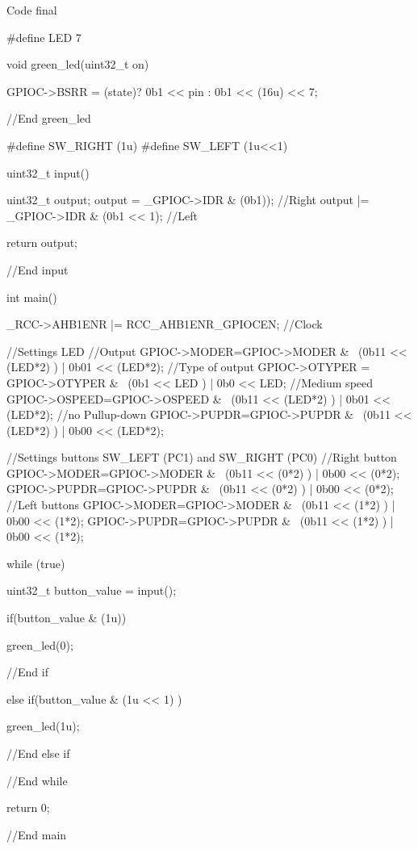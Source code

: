 \begin{Cpp}{Code final}

  #define LED 7
  
  void green_led(uint32_t on){

    GPIOC->BSRR = (state)? 0b1 << pin : 0b1 << (16u) << 7;

  }//End green_led

  #define SW_RIGHT (1u)
  #define SW_LEFT (1u<<1)

  uint32_t input(){

    uint32_t output;
    output = _GPIOC->IDR & (0b1)); //Right
    output |= _GPIOC->IDR & (0b1 << 1); //Left
  
    return output;

  }//End input

  int main(){
  
    _RCC->AHB1ENR |= RCC_AHB1ENR_GPIOCEN; //Clock

    //Settings LED
    //Output
    GPIOC->MODER=GPIOC->MODER & ~(0b11 << (LED*2) ) | 0b01 << (LED*2); 
    //Type of output
    GPIOC->OTYPER = GPIOC->OTYPER & ~(0b1 << LED ) | 0b0 << LED; 
    //Medium speed
    GPIOC->OSPEED=GPIOC->OSPEED & ~(0b11 << (LED*2) ) | 0b01 << (LED*2);
    //no Pullup-down
    GPIOC->PUPDR=GPIOC->PUPDR & ~(0b11 << (LED*2) ) | 0b00 << (LED*2);


    //Settings buttons SW_LEFT (PC1) and SW_RIGHT (PC0)
    //Right button
    GPIOC->MODER=GPIOC->MODER & ~(0b11 << (0*2) ) | 0b00 << (0*2); 
    GPIOC->PUPDR=GPIOC->PUPDR & ~(0b11 << (0*2) ) | 0b00 << (0*2);
    //Left buttons
    GPIOC->MODER=GPIOC->MODER & ~(0b11 << (1*2) ) | 0b00 << (1*2); 
    GPIOC->PUPDR=GPIOC->PUPDR & ~(0b11 << (1*2) ) | 0b00 << (1*2);
  
    while (true){
  
      uint32_t button_value = input();
  
      if(button_value & (1u)){
  
        green_led(0);
  
      }//End if
  
      else if(button_value & (1u << 1) ){
      
        green_led(1u);

      }//End else if

    }//End while

  return 0;
  }//End main

\end{Cpp}